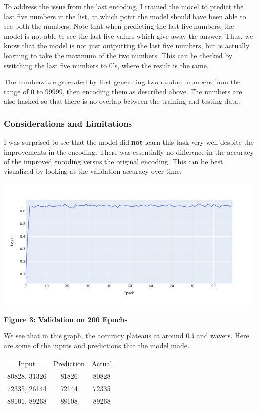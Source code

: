 \documentclass{article}
\begin{document}
To address the issue from the last encoding, I trained the model to predict the last five numbers in the list, at which point the model should have been able to see both the numbers. Note that when predicting the last five numbers, the model is not able to see the last five values which give away the answer. Thus, we know that the model is not just outputting the last five numbers, but is actually learning to take the maximum of the two numbers. This can be checked by switching the last five numbers to 0's, where the result is the same.

The numbers are generated by first generating two random numbers from the range of 0 to 99999, then encoding them as described above. The numbers are also hashed so that there is no overlap between the training and testing data.

\subsubsection{Considerations and Limitations}
I was surprised to see that the model did \textbf{not} learn this task very well despite the improvements in the encoding. There was essentially no difference in the accuracy of the improved encoding versus the original encoding. This can be best visualized by looking at the validation accuracy over time. 

\begin{center}
    \includegraphics[scale=0.4]{encoding_answer.png}

    \textbf{Figure 3: Validation on 200 Epochs}

\end{center}

We see that in this graph, the accuracy plateaus at around 0.6 and wavers. Here are some of the inputs and predictions that the model made.

\begin{center}
    \begin{tabular} {c c c}
        Input & Prediction & Actual \\
        80828, 31326 & 81826 & 80828 \\
        72335, 26144 & 72144 & 72335 \\
        88101, 89268 & 88108 & 89268
    \end{tabular}
\end{center}
\end{document}
